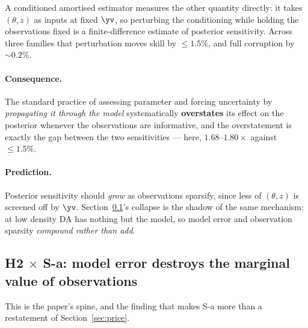 A conditioned amortised estimator measures the other quantity directly: it takes
$(\theta,z)$ as inputs at fixed $\yv$, so perturbing the conditioning while
holding the observations fixed is a finite-difference estimate of posterior
sensitivity. Across three families that perturbation moves skill by
$\leq 1.5\%$, and full corruption by $\sim 0.2\%$.

\paragraph{Consequence.}
The standard practice of assessing parameter and forcing uncertainty by
\emph{propagating it through the model} systematically \textbf{overstates} its
effect on the posterior whenever the observations are informative, and the
overstatement is exactly the gap between the two sensitivities --- here,
$1.68$--$1.80\times$ against $\leq 1.5\%$.

\paragraph{Prediction.}
Posterior sensitivity should \emph{grow} as observations sparsify, since less of
$(\theta,z)$ is screened off by $\yv$. Section~\ref{sec:marginal}'s collapse is
the shadow of the same mechanism: at low density DA has nothing but the model,
so model error and observation sparsity \emph{compound rather than add}.

\subsection{H2 $\times$ S-a: model error destroys the marginal value of observations}
\label{sec:marginal}

This is the paper's spine, and the finding that makes S-a more than a restatement
of Section~\ref{sec:price}.

